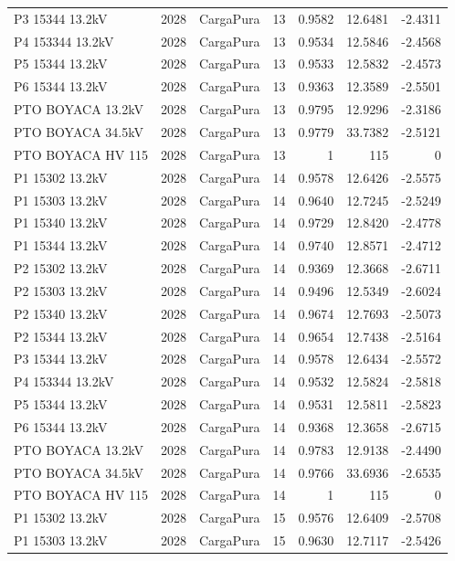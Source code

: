 \documentclass[11pt,a4paper]{article}
\begin{document}
\begin{longtable}{llllrrr}
P3 15344 13.2kV & 2028 & CargaPura & 13 & 0.9582 & 12.6481 & -2.4311 \\
P4 153344 13.2kV & 2028 & CargaPura & 13 & 0.9534 & 12.5846 & -2.4568 \\
P5 15344 13.2kV & 2028 & CargaPura & 13 & 0.9533 & 12.5832 & -2.4573 \\
P6 15344 13.2kV & 2028 & CargaPura & 13 & 0.9363 & 12.3589 & -2.5501 \\
PTO BOYACA 13.2kV & 2028 & CargaPura & 13 & 0.9795 & 12.9296 & -2.3186 \\
PTO BOYACA 34.5kV & 2028 & CargaPura & 13 & 0.9779 & 33.7382 & -2.5121 \\
PTO BOYACA HV 115 & 2028 & CargaPura & 13 & 1 & 115 & 0 \\
P1 15302 13.2kV & 2028 & CargaPura & 14 & 0.9578 & 12.6426 & -2.5575 \\
P1 15303 13.2kV & 2028 & CargaPura & 14 & 0.9640 & 12.7245 & -2.5249 \\
P1 15340 13.2kV & 2028 & CargaPura & 14 & 0.9729 & 12.8420 & -2.4778 \\
P1 15344 13.2kV & 2028 & CargaPura & 14 & 0.9740 & 12.8571 & -2.4712 \\
P2 15302 13.2kV & 2028 & CargaPura & 14 & 0.9369 & 12.3668 & -2.6711 \\
P2 15303 13.2kV & 2028 & CargaPura & 14 & 0.9496 & 12.5349 & -2.6024 \\
P2 15340 13.2kV & 2028 & CargaPura & 14 & 0.9674 & 12.7693 & -2.5073 \\
P2 15344 13.2kV & 2028 & CargaPura & 14 & 0.9654 & 12.7438 & -2.5164 \\
P3 15344 13.2kV & 2028 & CargaPura & 14 & 0.9578 & 12.6434 & -2.5572 \\
P4 153344 13.2kV & 2028 & CargaPura & 14 & 0.9532 & 12.5824 & -2.5818 \\
P5 15344 13.2kV & 2028 & CargaPura & 14 & 0.9531 & 12.5811 & -2.5823 \\
P6 15344 13.2kV & 2028 & CargaPura & 14 & 0.9368 & 12.3658 & -2.6715 \\
PTO BOYACA 13.2kV & 2028 & CargaPura & 14 & 0.9783 & 12.9138 & -2.4490 \\
PTO BOYACA 34.5kV & 2028 & CargaPura & 14 & 0.9766 & 33.6936 & -2.6535 \\
PTO BOYACA HV 115 & 2028 & CargaPura & 14 & 1 & 115 & 0 \\
P1 15302 13.2kV & 2028 & CargaPura & 15 & 0.9576 & 12.6409 & -2.5708 \\
P1 15303 13.2kV & 2028 & CargaPura & 15 & 0.9630 & 12.7117 & -2.5426 \\

\end{longtable}
\end{document}
